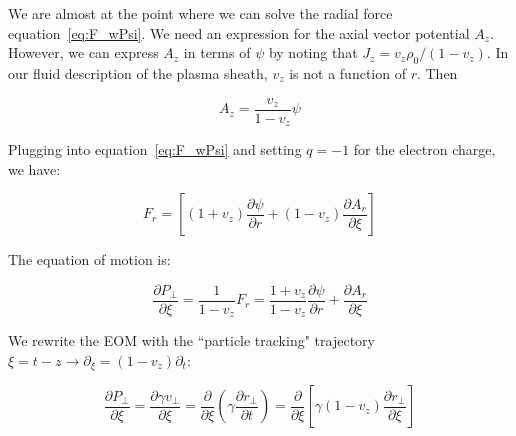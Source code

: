 \documentclass[aps,prl,preprint,groupedaddress]{revtex4-1}
\begin{document}

We are almost at the point where we can solve the radial force equation~\ref{eq:F_wPsi}. We need an expression for the axial vector potential $A_z$. However, we can express $A_z$ in terms of $\psi$ by noting that $J_z = v_z \rho_0 /(1-v_z)$. In our fluid description of the plasma sheath, $v_z$ is not a function of $r$. Then 

\begin{equation}\label{eq:A_z_Psi}
A_z = \frac{v_z}{1-v_z}\psi
\end{equation}

Plugging into equation~\ref{eq:F_wPsi} and setting $q = -1$ for the electron charge, we have:

\begin{equation}\label{eq:psi_for_az}
F_r = \left[ (1+v_z)\frac{\partial \psi}{\partial r} + (1-v_z)\frac{\partial A_r}{\partial \xi}\right] 
\end{equation}








%

The equation of motion is: 

\begin{equation}\label{eq:EOM_1}
\frac{\partial P_\perp}{\partial \xi} = \frac{1}{1-v_z} F_r = \frac{1+v_z}{1-v_z}\frac{\partial \psi}{\partial r} + \frac{\partial A_r}{\partial \xi}
\end{equation}

We rewrite the EOM with the ``particle tracking" trajectory $\xi = t - z \rightarrow \partial_{\xi} = (1-v_z)\partial_t$:

\begin{equation}\label{eq:track}
\frac{\partial P_{\perp}}{\partial \xi} = \frac{\partial \gamma v_{\perp}}{\partial \xi} =  \frac{\partial}{\partial \xi}\left(\gamma \frac{\partial r_{\perp}}{\partial t}\right) = \frac{\partial}{\partial \xi}\left[\gamma (1-v_z)\frac{\partial r_{\perp}}{\partial \xi}\right]
\end{equation}
\end{document}
